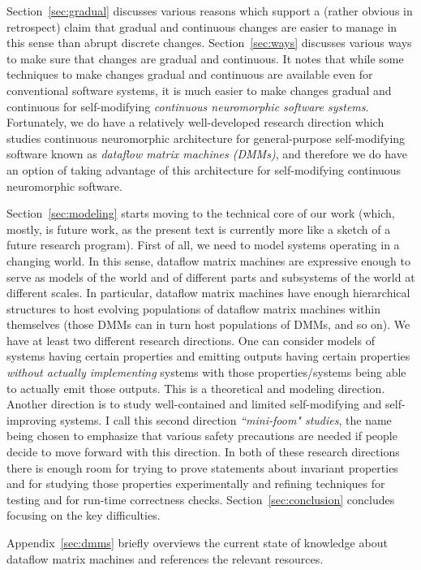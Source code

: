 \documentclass{article}
\begin{document}
Section~\ref{sec:gradual} discusses various reasons which support a (rather obvious in retrospect) claim
that gradual and continuous changes are easier to manage in this sense than abrupt discrete changes.
Section~\ref{sec:ways} discusses various ways to make sure that changes are gradual and
continuous. It notes that while some techniques to make changes gradual and continuous are available
even for conventional software systems, it is much easier to make changes gradual and continuous for self-modifying
{\em continuous neuromorphic software systems}. Fortunately, we do have a relatively well-developed research
direction which studies continuous neuromorphic architecture for general-purpose self-modifying software known as
{\em dataflow matrix machines (DMMs)}, and therefore we do have an option of taking advantage of this
architecture for self-modifying continuous neuromorphic software.

Section~\ref{sec:modeling} starts moving to the technical core of our work (which, mostly, is future work,
as the present text is currently more like a sketch of a future research program). First of all, we need to model
systems operating in a changing world. In this sense, dataflow matrix machines are expressive enough to
serve as models of the world and of different parts and subsystems of the world at different scales.
In particular, dataflow matrix machines have enough hierarchical structures to host evolving populations of dataflow
matrix machines within themselves (those DMMs can in turn host populations of DMMs, and so on). We have
at least two different research directions. One can consider models of systems having certain properties and emitting
outputs having certain properties {\em without actually implementing} systems with those properties/systems
being able to actually emit those outputs. This is a theoretical and modeling direction. Another direction is to study
well-contained and limited self-modifying and self-improving systems. I call this second direction {\em ``mini-foom" studies},
the name being chosen to emphasize that various safety precautions are needed if people decide to move forward
with this direction. In both of these research directions there is enough room for trying to prove statements
about invariant properties and for studying those properties experimentally and refining techniques for
testing and for run-time correctness checks. 
Section~\ref{sec:conclusion} concludes focusing on the key difficulties.

Appendix~\ref{sec:dmms} briefly overviews the current state of knowledge about dataflow matrix machines
and references the relevant resources.
\end{document}
